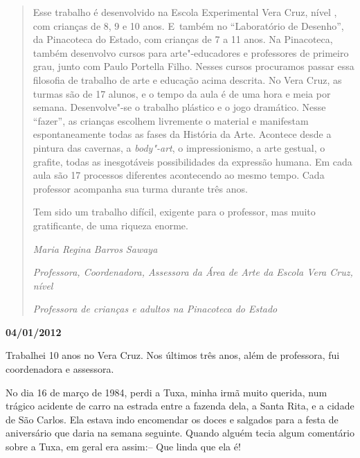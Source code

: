 \begin{quote}
Esse trabalho é desenvolvido na Escola Experimental Vera Cruz, nível ,
com crianças de 8, 9 e 10 anos. E~também no ``Laboratório de Desenho'',
da Pinacoteca do Estado, com crianças de 7 a 11 anos. Na Pinacoteca,
também desenvolvo cursos para arte"-educadores e professores de primeiro
grau, junto com Paulo Portella Filho. Nesses cursos procuramos passar
essa filosofia de trabalho de arte e educação acima descrita. No Vera
Cruz, as turmas são de 17 alunos, e o tempo da aula é de uma hora e meia
por semana. Desenvolve"-se o trabalho plástico e o jogo dramático. Nesse
``fazer'', as crianças escolhem livremente o material e manifestam
espontaneamente todas as fases da História da Arte. Acontece desde a
pintura das cavernas, a \emph{body"-art}, o impressionismo, a arte
gestual, o grafite, todas as inesgotáveis possibilidades da expressão
humana. Em cada aula são 17 processos diferentes acontecendo ao mesmo
tempo. Cada professor acompanha sua turma durante três anos.

Tem sido um trabalho difícil, exigente para o professor, mas muito
gratificante, de uma riqueza enorme.

\medskip{} 

\begin{flushright}\emph{Maria Regina Barros Sawaya}\end{flushright}

\begin{flushright}\emph{Professora, Coordenadora, Assessora da Área de Arte da Escola Vera
Cruz, nível }\end{flushright}

\begin{flushright}\emph{Professora de crianças e adultos na Pinacoteca do Estado}\end{flushright}


\end{quote}
\begin{center}\asterisc{}\end{center}

\begin{flushright}\textbf{04/01/2012}\end{flushright}


Trabalhei 10 anos no Vera Cruz. Nos últimos três anos, além de
professora, fui coordenadora e assessora.

No dia 16 de março de 1984, perdi a Tuxa, minha irmã muito querida, num
trágico acidente de carro na estrada entre a fazenda dela, a Santa Rita,
e a cidade de São Carlos. Ela estava indo encomendar os doces e salgados
para a festa de aniversário que daria na semana seguinte. Quando alguém
tecia algum comentário sobre a Tuxa, em geral era assim:-- Que linda que
ela é!

